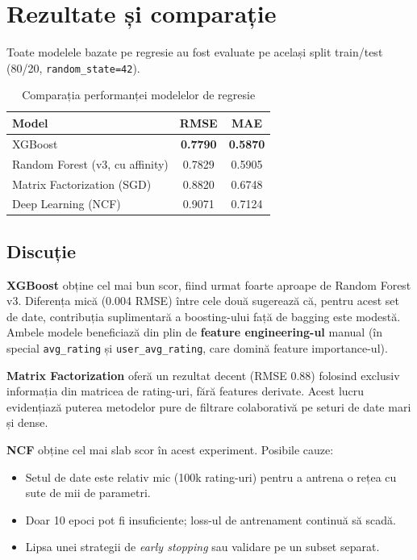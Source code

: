 \documentclass[12pt,a4paper]{article}
\begin{document}
\section{Rezultate și comparație}

Toate modelele bazate pe regresie au fost evaluate pe același split train/test (80/20, \texttt{random\_state=42}).

\begin{table}[H]
\centering
\begin{tabular}{lcc}
\toprule
\textbf{Model} & \textbf{RMSE} & \textbf{MAE} \\
\midrule
XGBoost                          & \textbf{0.7790} & \textbf{0.5870} \\
Random Forest (v3, cu affinity)  & 0.7829 & 0.5905 \\
Matrix Factorization (SGD)       & 0.8820 & 0.6748 \\
Deep Learning (NCF)              & 0.9071 & 0.7124 \\
\bottomrule
\end{tabular}
\caption{Comparația performanței modelelor de regresie}
\label{tab:rezultate}
\end{table}

\subsection{Discuție}

\textbf{XGBoost} obține cel mai bun scor, fiind urmat foarte aproape de Random Forest v3. Diferența mică (0.004 RMSE) între cele două sugerează că, pentru acest set de date, contribuția suplimentară a boosting-ului față de bagging este modestă. Ambele modele beneficiază din plin de \textbf{feature engineering-ul} manual (în special \texttt{avg\_rating} și \texttt{user\_avg\_rating}, care domină feature importance-ul).

\textbf{Matrix Factorization} oferă un rezultat decent (RMSE 0.88) folosind exclusiv informația din matricea de rating-uri, fără features derivate. Acest lucru evidențiază puterea metodelor pure de filtrare colaborativă pe seturi de date mari și dense.

\textbf{NCF} obține cel mai slab scor în acest experiment. Posibile cauze:
\begin{itemize}[noitemsep]
    \item Setul de date este relativ mic (100k rating-uri) pentru a antrena o rețea cu sute de mii de parametri.
    \item Doar 10 epoci pot fi insuficiente; loss-ul de antrenament continuă să scadă.
    \item Lipsa unei strategii de \textit{early stopping} sau validare pe un subset separat.
\end{itemize}
\end{document}
